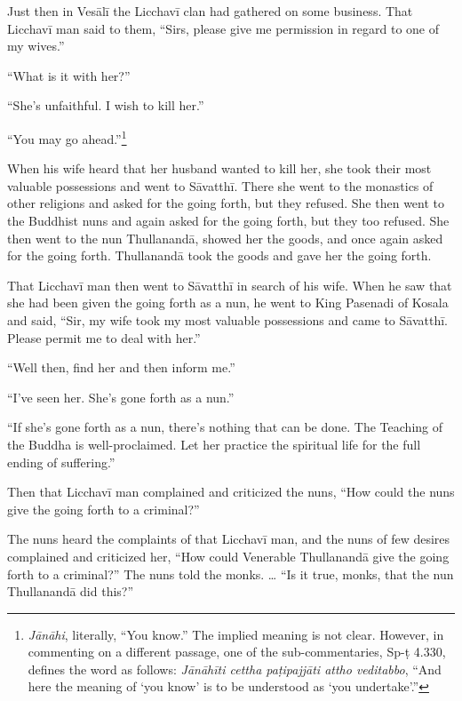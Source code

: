 \documentclass[12pt,openany]{book}%
\begin{document}
Just then in \textsanskrit{Vesālī} the \textsanskrit{Licchavī} clan had gathered on some business. That \textsanskrit{Licchavī} man said to them, “Sirs, please give me permission in regard to one of my wives.” 

“What is it with her?” 

“She’s unfaithful. I wish to kill her.” 

“You may go ahead.”\footnote{\textit{\textsanskrit{Jānāhi}}, literally, “You know.” The implied meaning is not clear. However, in commenting on a different passage, one of the sub-commentaries, Sp-\textsanskrit{ṭ} 4.330, defines the word as follows: \textit{\textsanskrit{Jānāhīti} cettha \textsanskrit{paṭipajjāti} attho veditabbo}, “And here the meaning of ‘you know’ is to be understood as ‘you undertake’.” } 

When his wife heard that her husband wanted to kill her, she took their most valuable possessions and went to \textsanskrit{Sāvatthī}. There she went to the monastics of other religions and asked for the going forth, but they refused. She then went to the Buddhist nuns and again asked for the going forth, but they too refused. She then went to the nun \textsanskrit{Thullanandā}, showed her the goods, and once again asked for the going forth. \textsanskrit{Thullanandā} took the goods and gave her the going forth. 

That \textsanskrit{Licchavī} man then went to \textsanskrit{Sāvatthī} in search of his wife. When he saw that she had been given the going forth as a nun, he went to King Pasenadi of Kosala and said, “Sir, my wife took my most valuable possessions and came to \textsanskrit{Sāvatthī}. Please permit me to deal with her.” 

“Well then, find her and then inform me.” 

“I’ve seen her. She’s gone forth as a nun.” 

“If she’s gone forth as a nun, there’s nothing that can be done. The Teaching of the Buddha is well-proclaimed. Let her practice the spiritual life for the full ending of suffering.” 

Then that \textsanskrit{Licchavī} man complained and criticized the nuns, “How could the nuns give the going forth to a criminal?” 

The nuns heard the complaints of that \textsanskrit{Licchavī} man, and the nuns of few desires complained and criticized her, “How could Venerable \textsanskrit{Thullanandā} give the going forth to a criminal?” The nuns told the monks. … “Is it true, monks, that the nun \textsanskrit{Thullanandā} did this?” 
\end{document}
